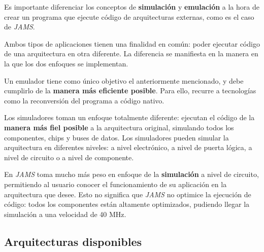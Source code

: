 Es importante diferenciar los conceptos de \textbf{simulación}
y \textbf{emulación} a la hora de crear un programa que ejecute
código de arquitecturas externas, como es el caso de \textit{JAMS}.

\noindent Ambos tipos de aplicaciones tienen una finalidad en común:
poder ejecutar código de una arquitectura en otra diferente.
La diferencia se manifiesta en la manera en la que los dos enfoques
se implementan.

\noindent Un emulador tiene como único objetivo el anteriormente
mencionado, y debe cumplirlo de la \textbf{manera más eficiente posible}.
Para ello, recurre a tecnologías como la reconversión del programa
a código nativo.

\noindent Los simuladores toman un enfoque totalmente diferente:
ejecutan el código de la \textbf{manera más fiel posible} a la
arquitectura original, simulando todos los componentes, chips y
buses de datos.
Los simuladores pueden simular la arquitectura en diferentes
niveles: a nivel electrónico, a nivel de puerta lógica, a nivel
de circuito o a nivel de componente.

\noindent En \textit{JAMS} toma mucho más peso en enfoque de la
\textbf{simulación} a nivel de circuito, permitiendo al usuario
conocer el funcionamiento de su aplicación en la arquitectura que desee.
Esto no significa que \textit{JAMS} no optimice la ejecución de código:
todos los componentes están altamente optimizados, pudiendo llegar
la simulación a una velocidad de 40 MHz.

\subsection{Arquitecturas disponibles}\label{subsec:arquitecturas-disponibles}

